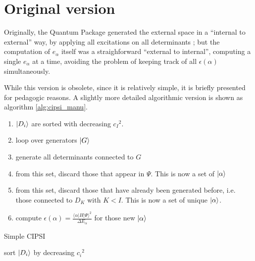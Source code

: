 \documentclass[./thesis.tex]{subfiles}
\begin{document}
\section{Original version}

Originally, the Quantum Package generated the external space in a ``internal to external'' way, by applying all excitations on all determinants ; but the computation of $e_\alpha$ itself was a straighforward ``external to internal'', computing a single $e_\alpha$ at a time, avoiding the problem of keeping track of all $\epsilon(\alpha)$ simultaneously.

While this version is obsolete, since it is relatively simple, it is briefly presented for pedagogic reasons. A slightly more detailed algorithmic version is shown as algorithm \ref{alg:cipsi_manu}.

\begin{enumerate}
\item
$\ket {D_i}$ are sorted with decreasing ${c_I}^2$.
\item
loop over generators $\ket G$
\item
generate all determinants connected to $G$
\item
from this set, discard those that appear in $\Psi$. This is now a set of $\ket \alpha$
\item
from this set, discard those that have already been generated before, i.e. those connected to $D_K$ with $K<I$. This is now a set of unique $\ket \alpha$.
\item
compute $\epsilon(\alpha) = \frac{\langle \alpha|H|\Psi\rangle^2}{\Delta E_\alpha}$ for those new $\ket \alpha$
\end{enumerate}


\begin{algorithm}
	\label{alg:cipsi_manu}
	\caption{Simple CIPSI}
		\KwData{ $\ket \Psi$ }
		sort $\ket {D_i}$ by decreasing ${c_i}^2$ \;
\end{algorithm}
\end{document}

